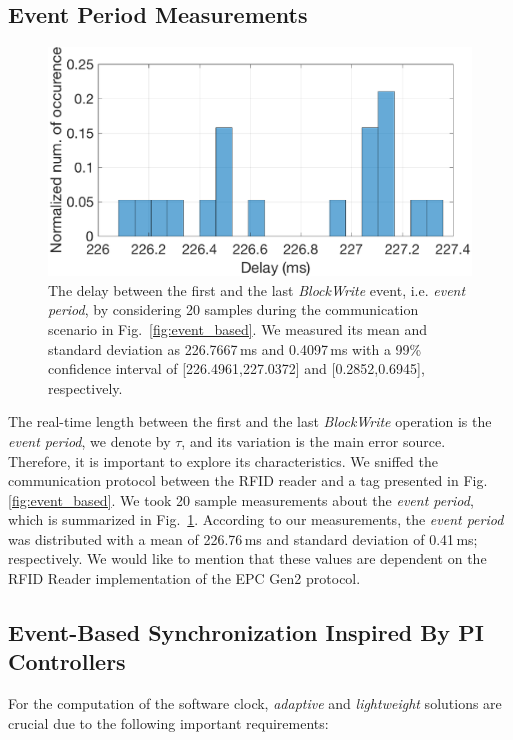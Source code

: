 \documentclass[10pt,journal,compsoc]{IEEEtran}
\begin{document}
\subsection{Event Period Measurements}
\label{subsec:event_period_uncertainty}

\begin{figure}
	\centering
	\includegraphics[width = 0.9\columnwidth]{figures/blockwrite_delay.eps}
	\caption{\label{fig:block_write_delay}The delay between the first and the last \emph{BlockWrite} event, i.e. \emph{event period}, by considering 20 samples during the communication scenario in Fig.~\ref{fig:event_based}. We measured its mean and standard deviation as 226.7667\,ms and 0.4097\,ms with a 99\% confidence interval of [226.4961,227.0372] and [0.2852,0.6945], respectively.}
\end{figure}

The real-time length between the first and the last \emph{BlockWrite} operation is the \emph{event period}, we denote by $\tau$, and its variation is the main error source. Therefore, it is important to explore its characteristics. We sniffed the communication protocol between the RFID reader and a tag presented in Fig. \ref{fig:event_based}. We took 20 sample measurements about the \emph{event period}, which is summarized in Fig.~\ref{fig:block_write_delay}. According to our measurements, the \emph{event period} was distributed with a mean of 226.76\,ms and standard deviation of 0.41\,ms; respectively. We would like to mention that these values are dependent on the RFID Reader implementation of the EPC Gen2 protocol.

\subsection{Event-Based Synchronization Inspired By PI Controllers}

For the computation of the software clock, \emph{adaptive} and \emph{lightweight} solutions are crucial due to the following important requirements:
\end{document}
